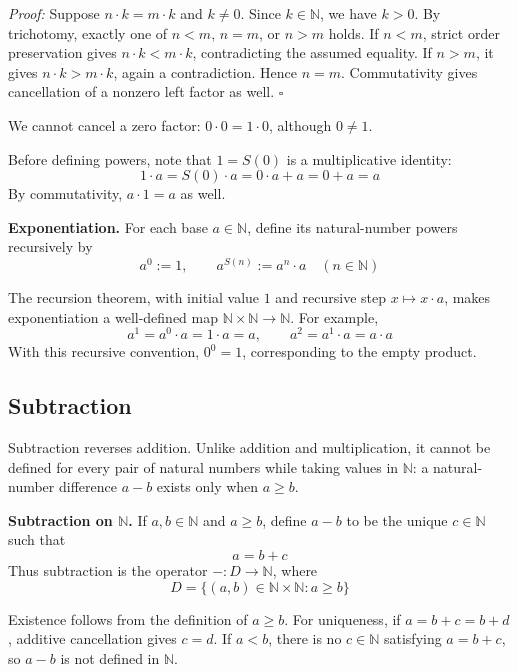 \documentclass[a4paper,11pt,abstracton]{scrartcl}
\newcommand{\NN}{\mathbb{N}}
\theoremstyle{dotlessP}
\theoremstyle{dotlessS}
\theoremstyle{remark}
\theoremstyle{definition}
\begin{document}
\begin{claim_box}
\textit{Proof:}
Suppose $n\cdot k=m\cdot k$ and $k\ne0$. Since $k\in\NN$, we have
$k>0$. By trichotomy, exactly one of $n<m$, $n=m$, or $n>m$ holds.
If $n<m$, strict order preservation gives $n\cdot k<m\cdot k$,
contradicting the assumed equality. If $n>m$, it gives
$n\cdot k>m\cdot k$, again a contradiction. Hence $n=m$.
Commutativity gives cancellation of a nonzero left factor as well.
\hfill$\square$
\end{claim_box}

We cannot cancel a zero factor: $0\cdot0=1\cdot0$, although $0\ne1$.

Before defining powers, note that $1=S(0)$ is a multiplicative identity:
\[
    1\cdot a=S(0)\cdot a=0\cdot a+a=0+a=a
\]
By commutativity, $a\cdot1=a$ as well.

\begin{definition_box}
\textbf{Exponentiation.} For each base $a\in\NN$, define its natural-number
powers recursively by
\[
    a^0:=1,
    \qquad a^{S(n)}:=a^n\cdot a
    \quad(n\in\NN)
\]
\end{definition_box}

The recursion theorem, with initial value $1$ and recursive step
$x\mapsto x\cdot a$, makes exponentiation a well-defined map
$\NN\times\NN\to\NN$. For example,
\[
    a^1=a^0\cdot a=1\cdot a=a,
    \qquad a^2=a^1\cdot a=a\cdot a
\]
With this recursive convention, $0^0=1$, corresponding to the empty
product.

\subsection{Subtraction}
\label{subsec:subtraction}

Subtraction reverses addition. Unlike addition and multiplication, it
cannot be defined for every pair of natural numbers while taking values
in $\NN$: a natural-number difference $a-b$ exists only when $a\ge b$.

\begin{definition_box}
\textbf{Subtraction on $\NN$.} If $a,b\in\NN$ and $a\ge b$, define
$a-b$ to be the unique $c\in\NN$ such that
\[
    a=b+c
\]
Thus subtraction is the operator $-:D\to\NN$, where
\[
    D=\{(a,b)\in\NN\times\NN:a\ge b\}
\]
\end{definition_box}

Existence follows from the definition of $a\ge b$. For uniqueness, if
$a=b+c=b+d$, additive cancellation gives $c=d$. If $a<b$, there is no
$c\in\NN$ satisfying $a=b+c$, so $a-b$ is not defined in $\NN$.
\end{document}
